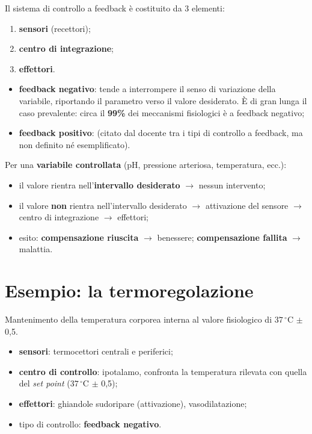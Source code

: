 Il sistema di controllo a feedback è costituito da 3 elementi:
\begin{enumerate}
  \item \textbf{sensori} (recettori);
  \item \textbf{centro di integrazione};
  \item \textbf{effettori}.
\end{enumerate}

\begin{itemize}
  \item \textbf{feedback negativo}: tende a interrompere il senso di variazione della variabile,
    riportando il parametro verso il valore desiderato. È di gran lunga il caso prevalente: circa
    il \textbf{99\%} dei meccanismi fisiologici è a feedback negativo;
  \item \textbf{feedback positivo}: (citato dal docente tra i tipi di controllo a feedback, ma non
    definito né esemplificato).
\end{itemize}

Per una \textbf{variabile controllata} (pH, pressione arteriosa, temperatura, ecc.):
\begin{itemize}
  \item il valore rientra nell'\textbf{intervallo desiderato} $\rightarrow$ nessun intervento;
  \item il valore \textbf{non} rientra nell'intervallo desiderato $\rightarrow$ attivazione del
    sensore $\rightarrow$ centro di integrazione $\rightarrow$ effettori;
  \item esito: \textbf{compensazione riuscita} $\rightarrow$ benessere; \textbf{compensazione
    fallita} $\rightarrow$ malattia.
\end{itemize}

\section{Esempio: la termoregolazione}

Mantenimento della temperatura corporea interna al valore fisiologico di $37\,^\circ$C $\pm$ 0,5.
\begin{itemize}
  \item \textbf{sensori}: termocettori centrali e periferici;
  \item \textbf{centro di controllo}: ipotalamo, confronta la temperatura rilevata con quella del
    \textit{set point} ($37\,^\circ$C $\pm$ 0,5);
  \item \textbf{effettori}: ghiandole sudoripare (attivazione), vasodilatazione;
  \item tipo di controllo: \textbf{feedback negativo}.
\end{itemize}

